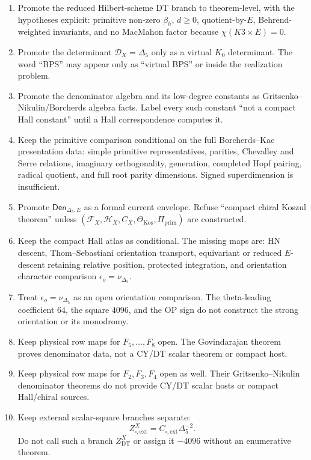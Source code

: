 \begin{enumerate}
\item Promote the reduced Hilbert-scheme DT branch to theorem-level,
with the hypotheses explicit: primitive non-zero \(\beta_h\), \(d\ge0\),
quotient-by-\(E\), Behrend-weighted invariants, and no MacMahon factor
because \(\chi(K3\times E)=0\).
\item Promote the determinant \(\mathcal D_X=\Delta_5\) only as a
virtual \(K_0\) determinant.  The word ``BPS'' may appear only as
``virtual BPS'' or inside the realization problem.
\item Promote the denominator algebra and its low-degree constants as
Gritsenko--Nikulin/Borcherds algebra facts.  Label every such constant
``not a compact Hall constant'' until a Hall correspondence computes it.
\item Keep the primitive comparison conditional on the full
Borcherds--Kac presentation data: simple primitive representatives,
parities, Chevalley and Serre relations, imaginary orthogonality,
generation, completed Hopf pairing, radical quotient, and full root
parity dimensions.  Signed superdimension is insufficient.
\item Promote \(\mathsf{Den}_{\Delta_5,E}\) as a formal current
envelope.  Refuse ``compact chiral Koszul theorem'' unless
\((\mathcal F_X,\mathcal H_X,C_X,\Theta_{\mathrm{Kos}},\Pi_{\mathrm{prim}})\)
are constructed.
\item Keep the compact Hall atlas as conditional.  The missing maps are:
HN descent, Thom--Sebastiani orientation transport, equivariant or
reduced \(E\)-descent retaining relative position, protected
integration, and orientation character comparison
\(\epsilon_o=\nu_{\Delta_5}\).
\item Treat \(\epsilon_o=\nu_{\Delta_5}\) as an open orientation
comparison.  The theta-leading coefficient \(64\), the square \(4096\),
and the OP sign do not construct the strong orientation or its monodromy.
\item Keep physical row maps for \(F_5,\ldots,F_8\) open.  The
Govindarajan theorem proves denominator data, not a CY/DT scalar theorem
or compact host.
\item Keep physical row maps for \(F_2,F_3,F_4\) open as well.  Their
Gritsenko--Nikulin denominator theorems do not provide CY/DT scalar
hosts or compact Hall/chiral sources.
\item Keep external scalar-square branches separate:
\[
Z^X_{\square,\mathrm{ext}}=C_{\square,\mathrm{ext}}\Delta_5^{-2}.
\]
Do not call such a branch \(Z^X_{\mathrm{DT}}\) or assign it
\(-4096\) without an enumerative theorem.
\end{enumerate}

